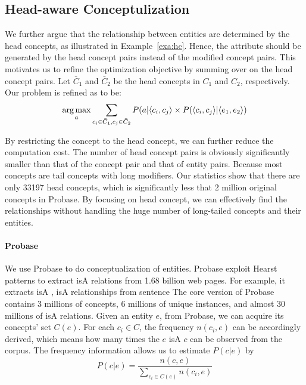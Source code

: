 \subsection{Head-aware Conceptulization}
We further argue that the relationship between entities are determined by the head concepts, as illustrated in Example~\ref{exa:hc}.
Hence, the attribute should be generated by the head concept pairs instead of the modified concept pairs.
This motivates us to refine the optimization objective by summing over on the head concept pairs.
Let $\bar{C}_1$ and $\bar{C}_2$ be the head concepts in  $C_1$ and $C_2$, respectively.
Our problem is refined as to be:
\begin{equation}
\label{eq:target_head}
\operatorname*{arg\,max}_a \sum_{c_i\in \bar{C}_1 , c_j \in \bar{C}_2 } P(a|\langle c_{i},c_{j} \rangle \times P(\langle c_{i},c_{j}\rangle|\langle e_{1},e_{2}\rangle)
\end{equation}

By restricting the concept to the head concept, we can further reduce the computation cost.
The number of head concept pairs is obviously significantly smaller than that of the concept pair and that of entity pairs.
Because most concepts are tail concepts with long modifiers.
Our statistics show that there are only 33197 head concepts, which is significantly less that 2 million original concepts in Probase.
By focusing on head concept, we can effectively find the relationships without handling the huge number of long-tailed concepts and their entities.

\paragraph*{Probase}
We use Probase to do conceptualization of entities. Probase exploit Hearst patterns to extract isA relations from 1.68 billion web pages. For example, it extracts  isA ,  isA  relationships from sentence 
The core version of Probase contains 3 millions of concepts, 6 millions of unique instances, and almost 30 millions of isA relations.
Given an entity $e$, from Probase, we can acquire its concepts' set $C(e)$.
For each $c_i \in C$, the frequency $n(c_i,e)$ can be accordingly derived, which means how many times the $e$ isA $c$ can be observed from the corpus.
The frequency information allows us to estimate  $P(c|e)$ by
$$P(c|e)=\frac{n(c,e)}{\sum_{c_i\in C(e)}n(c_i, e)}$$

